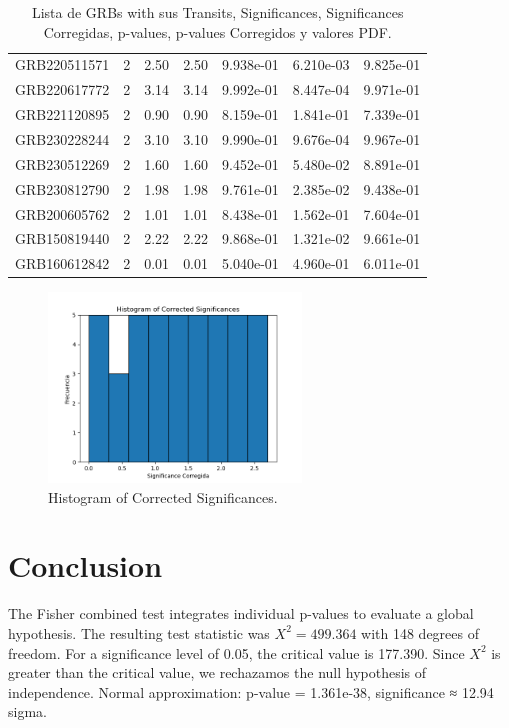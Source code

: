 \documentclass[12pt]{article}
\begin{document}
\begin{table}[h!]
{\begin{tabular}{l c c c c c c}
GRB220511571 & 2 & 2.50 & 2.50 & 9.938e-01 & 6.210e-03 & 9.825e-01 \\
GRB220617772 & 2 & 3.14 & 3.14 & 9.992e-01 & 8.447e-04 & 9.971e-01 \\
GRB221120895 & 2 & 0.90 & 0.90 & 8.159e-01 & 1.841e-01 & 7.339e-01 \\
GRB230228244 & 2 & 3.10 & 3.10 & 9.990e-01 & 9.676e-04 & 9.967e-01 \\
GRB230512269 & 2 & 1.60 & 1.60 & 9.452e-01 & 5.480e-02 & 8.891e-01 \\
GRB230812790 & 2 & 1.98 & 1.98 & 9.761e-01 & 2.385e-02 & 9.438e-01 \\
GRB200605762 & 2 & 1.01 & 1.01 & 8.438e-01 & 1.562e-01 & 7.604e-01 \\
GRB150819440 & 2 & 2.22 & 2.22 & 9.868e-01 & 1.321e-02 & 9.661e-01 \\
GRB160612842 & 2 & 0.01 & 0.01 & 5.040e-01 & 4.960e-01 & 6.011e-01 \\
\bottomrule
\end{tabular}%
}
\caption{Lista de GRBs with sus Transits, Significances, Significances Corregidas, p-values, p-values Corregidos y valores PDF.}
\end{table}

\begin{figure}[h!]
\centering
\includegraphics[width=0.6\textwidth]{corrected_significance_hist.png}
\caption{Histogram of Corrected Significances.}
\end{figure}

\section*{Conclusion}
The Fisher combined test integrates individual p-values to evaluate a global hypothesis.
The resulting test statistic was $X^2 = 499.364$ with 148 degrees of freedom.
For a significance level of 0.05, the critical value is 177.390.
Since $X^2$ is greater than the critical value, we rechazamos the null hypothesis of independence.
Normal approximation: p-value = 1.361e-38, significance ≈ 12.94 sigma.
\end{document}
